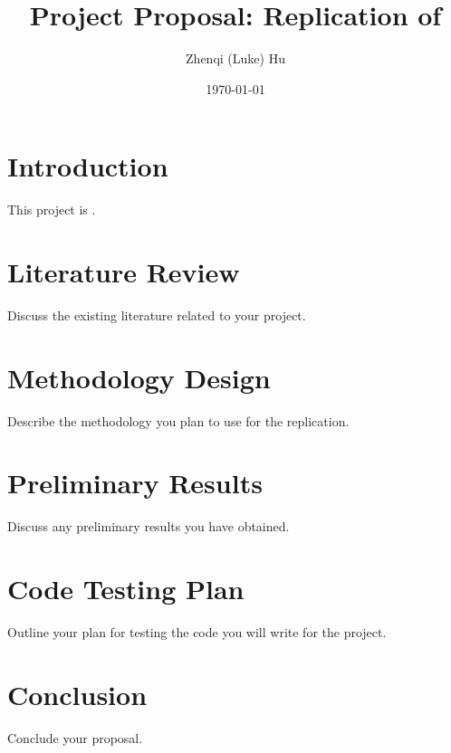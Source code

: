 \documentclass[12pt]{article}
\title{Project Proposal: Replication of \citet{childersDifferentiableStateSpaceModels2022}}
\author{Zhenqi (Luke) Hu}
\date{\today}
\begin{document}
\maketitle

\section{Introduction}
This project is  \citet{childersDifferentiableStateSpaceModels2022}.

\section{Literature Review}
Discuss the existing literature related to your project.

\section{Methodology Design}
Describe the methodology you plan to use for the replication.

\section{Preliminary Results}
Discuss any preliminary results you have obtained.

\section{Code Testing Plan}
Outline your plan for testing the code you will write for the project.

\section{Conclusion}
Conclude your proposal.


\end{document}
